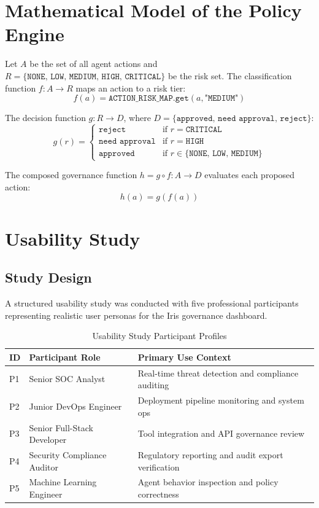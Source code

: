 \section{Mathematical Model of the Policy Engine}

Let $A$ be the set of all agent actions and $R = \{\texttt{NONE, LOW, MEDIUM, HIGH, CRITICAL}\}$ be the risk set. The classification function $f: A \rightarrow R$ maps an action to a risk tier:
\begin{equation}
f(a) = \texttt{ACTION\_RISK\_MAP.get}(a, \texttt{"MEDIUM"})
\end{equation}

The decision function $g: R \rightarrow D$, where $D = \{\texttt{approved, need approval, reject}\}$:
\begin{equation}
g(r) = \begin{cases}
  \texttt{reject}        & \text{if } r = \texttt{CRITICAL} \\
  \texttt{need approval} & \text{if } r = \texttt{HIGH} \\
  \texttt{approved}      & \text{if } r \in \{\texttt{NONE, LOW, MEDIUM}\}
\end{cases}
\end{equation}

The composed governance function $h = g \circ f : A \rightarrow D$ evaluates each proposed action:
\begin{equation}
h(a) = g(f(a))
\end{equation}

\section{Usability Study}

\subsection{Study Design}

A structured usability study was conducted with five professional participants representing realistic user personas for the Iris governance dashboard.

\begin{table}[H]
\centering
\caption{Usability Study Participant Profiles}
\begin{tabularx}{\textwidth}{l l X}
\toprule
\textbf{ID} & \textbf{Participant Role} & \textbf{Primary Use Context} \\
\midrule
P1 & Senior SOC Analyst          & Real-time threat detection and compliance auditing \\
P2 & Junior DevOps Engineer      & Deployment pipeline monitoring and system ops \\
P3 & Senior Full-Stack Developer & Tool integration and API governance review \\
P4 & Security Compliance Auditor & Regulatory reporting and audit export verification \\
P5 & Machine Learning Engineer   & Agent behavior inspection and policy correctness \\
\bottomrule
\end{tabularx}
\end{table}

